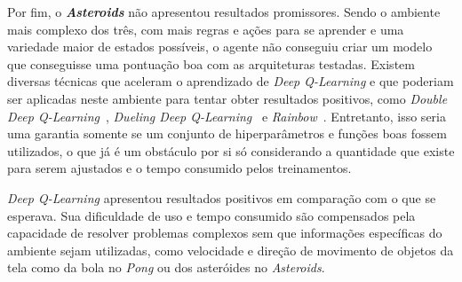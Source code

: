 Por fim, o \textbf{\textit{Asteroids}} não apresentou resultados promissores.
Sendo o ambiente mais complexo dos três, com mais regras e ações para se aprender e uma variedade maior de estados possíveis, o agente não conseguiu criar um modelo que conseguisse uma pontuação boa com as arquiteturas testadas.
Existem diversas técnicas que aceleram o aprendizado de \textit{Deep Q-Learning} e que poderiam ser aplicadas neste ambiente para tentar obter resultados positivos, como \textit{Double Deep Q-Learning}~\cite{DBLP:journals/corr/HasseltGS15}, \textit{Dueling Deep Q-Learning}~\cite{DBLP:journals/corr/WangFL15} e \textit{Rainbow}~\cite{DBLP:journals/corr/abs-1710-02298}.
Entretanto, isso seria uma garantia somente se um conjunto de hiperparâmetros e funções boas fossem utilizados, o que já é um obstáculo por si só considerando a quantidade que existe para serem ajustados e o tempo consumido pelos treinamentos.

\textit{Deep Q-Learning} apresentou resultados positivos em comparação com o que se esperava.
Sua dificuldade de uso e tempo consumido são compensados pela capacidade de resolver problemas complexos sem que informações específicas do ambiente sejam utilizadas, como velocidade e direção de movimento de objetos da tela como da bola no \textit{Pong} ou dos asteróides no \textit{Asteroids}.
